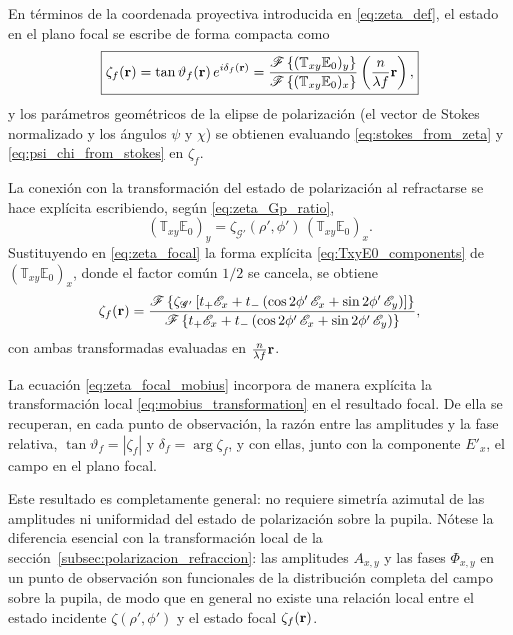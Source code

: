 En términos de la coordenada proyectiva introducida en \eqref{eq:zeta_def}, el
estado en el plano focal se escribe de forma compacta como
\begin{equation}
\boxed{
\zeta_f(\vb r)
=
\tan \vartheta_f(\vb r)\,e^{i\delta_f(\vb r)}
=
\frac{
\mathscr F
\left\{
(\mathbb{T}_{xy}\mathbb E_0)_y
\right\}
}{
\mathscr F
\left\{
(\mathbb{T}_{xy}\mathbb E_0)_x
\right\}
}
\left(
\frac{n}{\lambda f}\vb r
\right),
}
\label{eq:zeta_focal}
\end{equation}
y los parámetros geométricos de la elipse de polarización (el vector de Stokes
normalizado y los ángulos $\psi$ y $\chi$) se obtienen evaluando
\eqref{eq:stokes_from_zeta} y \eqref{eq:psi_chi_from_stokes} en $\zeta_f$.

La conexión con la transformación del estado de polarización al refractarse se
hace explícita escribiendo, según \eqref{eq:zeta_Gp_ratio},
\begin{equation*}
(\mathbb{T}_{xy}\mathbb E_0)_y
=
\zeta_{\mathscr{G}'}(\rho',\phi')\,
(\mathbb{T}_{xy}\mathbb E_0)_x.
\end{equation*}
Sustituyendo en \eqref{eq:zeta_focal} la forma explícita
\eqref{eq:TxyE0_components} de $(\mathbb{T}_{xy}\mathbb E_0)_x$, donde el
factor común $1/2$ se cancela, se obtiene
\begin{equation}
\zeta_f(\vb r)
=
\frac{
\mathscr F
\left\{
\zeta_{\mathscr{G}'}
\left[
t_+\mathscr E_x
+
t_-
\left(
\cos 2\phi'\, \mathscr E_x
+
\sin 2\phi'\, \mathscr E_y
\right)
\right]
\right\}
}{
\mathscr F
\left\{
t_+\mathscr E_x
+
t_-
\left(
\cos 2\phi'\, \mathscr E_x
+
\sin 2\phi'\, \mathscr E_y
\right)
\right\}
},
\label{eq:zeta_focal_mobius}
\end{equation}
con ambas transformadas evaluadas en $\frac{n}{\lambda f}\vb r$.

La ecuación \eqref{eq:zeta_focal_mobius} incorpora de manera explícita la
transformación local \eqref{eq:mobius_transformation} en el resultado focal.
De ella se recuperan, en cada punto de observación, la razón entre las
amplitudes y la fase relativa,
$\tan\vartheta_f=|\zeta_f|$ y $\delta_f=\arg\zeta_f$, y con ellas, junto con
la componente $E'_x$, el campo en el plano focal.

Este resultado es completamente general: no requiere simetría azimutal de las
amplitudes ni uniformidad del estado de polarización sobre la pupila. Nótese
la diferencia esencial con la transformación local de la
sección~\ref{subsec:polarizacion_refraccion}: las amplitudes $A_{x,y}$ y
las fases $\Phi_{x,y}$ en un punto de observación son funcionales de la
distribución completa del campo sobre la pupila, de modo que en general no
existe una relación local entre el estado incidente $\zeta(\rho',\phi')$ y el
estado focal $\zeta_f(\vb r)$.

